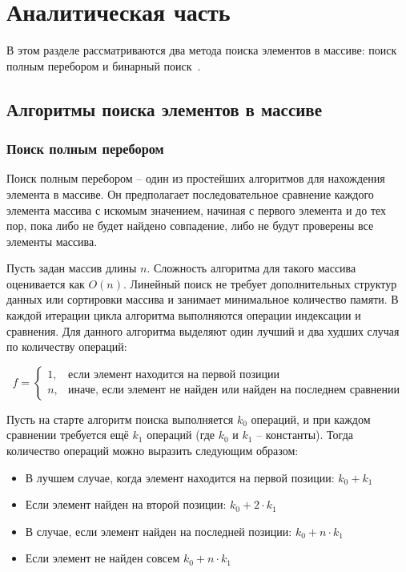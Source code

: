 \documentclass[a4paper, 12pt]{extreport}
\begin{document}
\chapter{Аналитическая часть}
В этом разделе рассматриваются два метода поиска элементов в массиве: поиск полным перебором и бинарный поиск~\cite{bib1}.

\section{Алгоритмы поиска элементов в массиве}

\subsection{Поиск полным перебором}
Поиск полным перебором -- один из простейших алгоритмов для нахождения элемента в массиве. Он предполагает последовательное сравнение каждого элемента массива с искомым значением, начиная с первого элемента и до тех пор, пока либо не будет найдено совпадение, либо не будут проверены все элементы массива.

Пусть задан массив длины $n$. Сложность алгоритма для такого массива оценивается как $O(n)$. Линейный поиск не требует дополнительных структур данных или сортировки массива и занимает минимальное количество памяти. В каждой итерации цикла алгоритма выполняются операции индексации и сравнения. Для данного алгоритма выделяют один лучший и два худших случая по количеству операций:

\begin{equation}
    \label{eq:search_case}
    f = 
    \begin{cases}
      1, & \text{если элемент находится на первой позиции} \\ 
      n, & \text{иначе, если элемент не найден или найден на последнем сравнении}
    \end{cases}
\end{equation}

Пусть на старте алгоритм поиска выполняется $k_0$ операций, и при каждом сравнении требуется ещё $k_1$ операций (где $k_0$ и $k_1$ -- константы). Тогда количество операций можно выразить следующим образом:

\begin{itemize}
    \item[--] В лучшем случае, когда элемент находится на первой позиции: $k_0 + k_1$
    \item[--] Если элемент найден на второй позиции: $k_0 + 2 \cdot k_1$
    \item В случае, если элемент найден на последней позиции: $k_0 + n \cdot k_1$
    \item[--] Если элемент не найден совсем $k_0 + n \cdot k_1$
\end{itemize}
\end{document}
